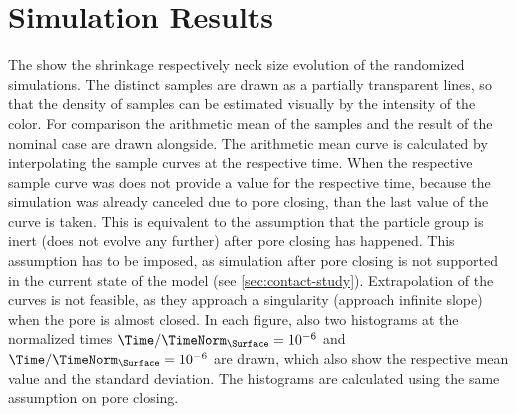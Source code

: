 \section{Simulation Results}\label{sec:randomized/results}

The  show the shrinkage respectively neck size evolution of the randomized simulations.
The distinct samples are drawn as a partially transparent lines, so that the density of samples can be estimated visually by the intensity of the color.
For comparison the arithmetic mean of the samples and the result of the nominal case are drawn alongside.
The arithmetic mean curve is calculated by interpolating the sample curves at the respective time.
When the respective sample curve was does not provide a value for the respective time, because the simulation was already canceled due to pore closing, than the last value of the curve is taken.
This is equivalent to the assumption that the particle group is inert (does not evolve any further) after pore closing has happened.
This assumption has to be imposed, as simulation after pore closing is not supported in the current state of the model (see \cref{sec:contact-study}).
Extrapolation of the curves is not feasible, as they approach a singularity (approach infinite slope) when the pore is almost closed.
In each figure, also two histograms at the normalized times $\Time/\TimeNorm_{\Surface} = \num[print-unity-mantissa=false]{1e-6}$ and $\Time/\TimeNorm_{\Surface} = \num[print-unity-mantissa=false]{1e-6}$ are drawn, which also show the respective mean value and the standard deviation.
The histograms are calculated using the same assumption on pore closing.

